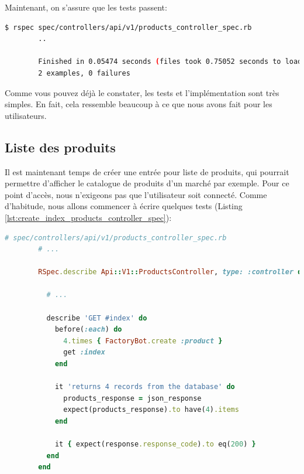 \documentclass[]{report}
\begin{document}
      Maintenant, on s'assure que les tests passent:

      \begin{scriptsize}
        \begin{lstlisting}[language=bash]
        $ rspec spec/controllers/api/v1/products_controller_spec.rb
        ..

        Finished in 0.05474 seconds (files took 0.75052 seconds to load)
        2 examples, 0 failures
        \end{lstlisting}
      \end{scriptsize}

      Comme vous pouvez déjà le constater, les tests et l'implémentation sont très simples. En fait, cela ressemble beaucoup à ce que nous avons fait pour les utilisateurs.

    \subsection{Liste des produits}

      Il est maintenant temps de créer une entrée pour liste de produits, qui pourrait permettre d'afficher le catalogue de produits d'un marché par exemple. Pour ce point d'accès, nous n'exigeons pas que l'utilisateur soit connecté. Comme d'habitude, nous allons commencer à écrire quelques tests (Listing \ref{lst:create_index_products_controller_spec}):

      \begin{scriptsize}
        \begin{lstlisting}[language=ruby, caption={Test de l'affichage des produits}, label={lst:create_index_products_controller_spec}]
        # spec/controllers/api/v1/products_controller_spec.rb
        # ...

        RSpec.describe Api::V1::ProductsController, type: :controller do

          # ...

          describe 'GET #index' do
            before(:each) do
              4.times { FactoryBot.create :product }
              get :index
            end

            it 'returns 4 records from the database' do
              products_response = json_response
              expect(products_response).to have(4).items
            end

            it { expect(response.response_code).to eq(200) }
          end
        end
        \end{lstlisting}
      \end{scriptsize}
\end{document}
